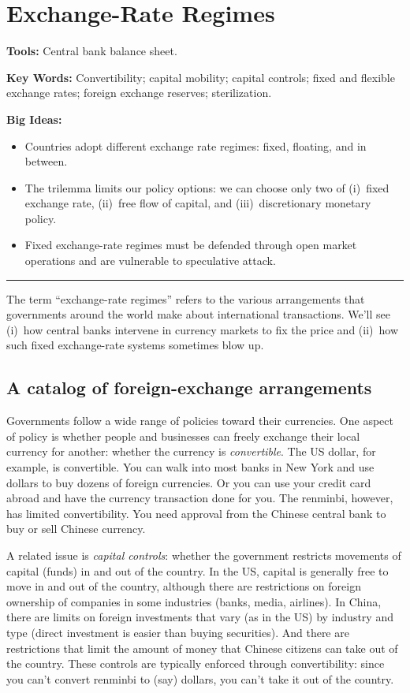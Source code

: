\chapter{Exchange-Rate Regimes}\label{chp:fxr}
\hypertarget{fxregimes}{}

\textbf{Tools:} Central bank balance sheet.

\textbf{Key Words:} Convertibility; capital mobility; capital controls; fixed and flexible exchange rates;
foreign exchange reserves; sterilization.

\textbf{Big Ideas:}
\vspace{-0.1in}
\begin{itemize}
\item Countries adopt different exchange rate regimes: fixed, floating, and in between.
\item The trilemma limits our policy options:  we can choose only two of
(i)~fixed exchange rate, (ii)~free flow of capital,
and (iii)~discretionary monetary policy.
\item Fixed exchange-rate regimes must be defended through open market operations 
and are vulnerable to speculative attack.
\end{itemize}
\rule{\textwidth}{1pt}

The term ``exchange-rate regimes'' refers to the various
arrangements that governments around the world make about
international transactions.
We'll see (i)~how central banks intervene
in currency markets to fix the price
and (ii)~how such fixed exchange-rate systems sometimes blow up.


\section{A catalog of foreign-exchange arrangements}

Governments follow a wide range of policies toward their currencies.
One aspect of policy is whether people and businesses can freely
exchange their local currency for another:
whether the currency is {\it convertible\/}.
The US dollar, for example, is convertible.
You can walk into most banks in New York and use dollars to buy dozens of foreign currencies.
Or you can use your credit card abroad and have the currency transaction
done for you.
The renminbi, however, has limited convertibility.
You need approval from the Chinese central bank to buy or sell Chinese currency.

A related issue is {\it capital controls\/}:
whether the government restricts movements of capital (funds)
in and out of the country.
In the US, capital is generally free to move in and out of the country,
although there are restrictions on foreign ownership of companies
in some industries (banks, media, airlines).
In China, there are limits on foreign investments that vary (as in the US)
by industry and type (direct investment is easier than buying securities).
And there are restrictions that limit the amount of money that Chinese citizens can take out of the country.
These controls are typically enforced through convertibility:
since you can't convert renminbi to (say) dollars, you can't
take it out of the country.


